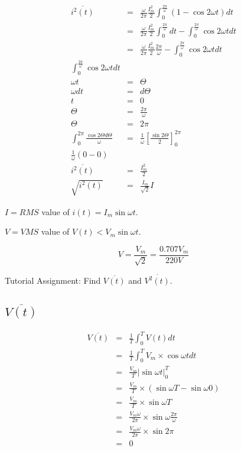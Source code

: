 \documentclass[a4paper,12pt]{article}
\begin{document}
\begin{eqnarray*}
\overline{i^{2}(t)} & = & \frac{\omega}{2 \pi} \frac{I_{m}^{2}}{2} \int^{\frac{2 \pi}{\omega}}_{0} (1 - \cos 2 \omega t) dt \\
& = & \frac{\omega}{2 \pi} \frac{I_{m}^{2}}{2} \int^{\frac{2 \pi}{\omega}}_{0} dt - \int^{\frac{2 \pi}{\omega}}_{0} \cos 2 \omega t dt \\
& = & \frac{\omega}{2 \pi} \frac{I_{m}^{2}}{2} \frac{2 \pi}{\omega} - \int^{\frac{2 \pi}{\omega}}_{0} \cos 2 \omega t dt \\
\int^{\frac{2 \pi}{\omega}}_{0} \cos 2 \omega t dt \\
\omega t & = &\Theta \\ 
\omega dt & = & d\Theta \\
t & = & 0 \\ 
\Theta & = & \frac{2 \pi}{\omega} \\ 
\Theta & = & 2 \pi \\
\int^{2 \pi}_{0} \frac{\cos 2 \Theta d \Theta}{\omega} & = & \frac{1}{\omega} \left[ \frac{\sin 2 \Theta}{2} \right]^{2 \pi}_{0} \\
\frac{1}{\omega} (0 - 0) \\
\overline{i^{2}(t)} & = & \frac{I_{m}^{2}}{2} \\
\sqrt{i^{2}(t)} & = & \frac{I_{m}}{\sqrt{2}} I
\end{eqnarray*}

$I = RMS$ value of $i(t) = I_{m} \sin \omega t$.

$V = VMS$ value of $V(t) < V_{m} \sin \omega t$.

\[ V = \frac{V_{m}}{\sqrt{2}} = \frac{0.707 V_{m}}{220V} \]


Tutorial Assignment: Find $\overline{V(t)}$ and $\overline{V^{2}(t)}$.

\subsection{$\overline{V(t)}$}

\begin{eqnarray*}
\overline{V(t)} & = & \frac{1}{T} \int^{T}_{0} V(t)  dt \\
					 & = & \frac{1}{T} \int^{T}_{0} V_{m} \times \cos\omega t dt \\
					 & = & \frac{V_{m}}{T} \left| \sin\omega t \right|^{T}_{0} \\
					 & = & \frac{V_{m}}{T} \times \left( \sin\omega T - \sin\omega 0 \right) \\
					 & = & \frac{V_{m}}{T} \times \sin\omega T \\
					 & = & \frac{V_{m} \omega}{2 \pi} \times \sin\omega \frac{2 \pi}{\omega} \\
					 & = & \frac{V_{m} \omega}{2 \pi} \times \sin2\pi \\
					 & = & 0
\end{eqnarray*}
\end{document}
